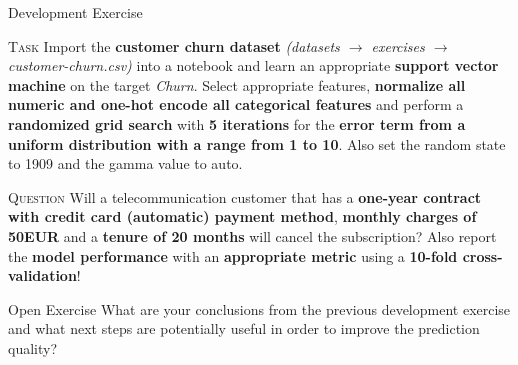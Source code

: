 \documentclass[document.tex]{subfiles}
\begin{document}
    \begin{frame}{Development Exercise }
        \begin{alertblock}{\textsc{Task}}
            Import the \textbf{customer churn dataset} \textit{(datasets $\rightarrow$ exercises $\rightarrow$ customer-churn.csv)} into a notebook and learn an appropriate \textbf{support vector machine} on the target \textit{Churn}. Select appropriate features, \textbf{normalize all numeric and one-hot encode all categorical features} and perform a \textbf{randomized grid search} with \textbf{5 iterations} for the \textbf{error term from a uniform distribution with a range from 1 to 10}. Also set the random state to 1909 and the gamma value to auto.
        \end{alertblock}
        \begin{alertblock}{\textsc{Question}}
            Will a telecommunication customer that has a \textbf{one-year contract with credit card (automatic) payment method}, \textbf{monthly charges of 50EUR} and a \textbf{tenure of 20 months} will cancel the subscription? Also report the \textbf{model performance} with an \textbf{appropriate metric} using a \textbf{10-fold cross-validation}!
        \end{alertblock}
    \end{frame}

    \begin{frame}{Open Exercise }
        What are your conclusions from the previous development exercise and what next steps are potentially useful in order to improve the prediction quality?
    \end{frame}

\end{document}
